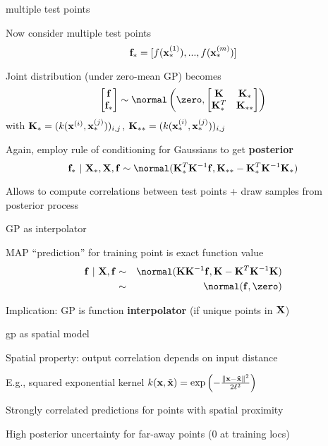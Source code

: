 \documentclass[11pt,compress,t,notes=noshow, xcolor=table]{beamer}
\begin{document}
\begin{framei}[sep=L]{multiple test points}
\item Now consider multiple test points
$$\fv_* = [f(\xi[1]_*), ..., f(\xi[m]_*)]$$
\item Joint distribution (under zero-mean GP) becomes
$$
    \begin{bmatrix} \fv \\ \fv_* \end{bmatrix} \sim  
    \normal\left(\zero, \begin{bmatrix} \Kmat & \Ks \\ \Ks^T & \Kss \end{bmatrix}\right)
  $$
with $\Ks = (k(\xi, \xs^{(j)}))_{i,j}$, $\Kss = (k(\xi[i]_*, \xi[j]_*))_{i,j}$
\item Again, employ rule of conditioning for Gaussians to get \textbf{posterior}
$$\fv_* ~|~ \Xmat_*, \Xmat, \fv \sim \normal(\Ks^{T}\Kinv\fv, \Kss - \Ks^T \Kmat ^{-1}\Ks)$$
\item Allows to compute correlations between test points + draw samples from posterior process
\end{framei}

\begin{framei}[sep=L]{GP as interpolator}
\item MAP ``prediction'' for training point is exact function value
\begin{eqnarray*}
\fv ~|~ \Xmat, \fv &\sim& \normal(\Kmat\Kinv\fv, \Kmat - \Kmat^T \Kinv \Kmat) \\ &\sim& \normal(\fv, \zero)
\end{eqnarray*}
\item Implication: GP is function \textbf{interpolator} (if unique points in $\Xmat$)
\vfill
{}
\end{framei}

\begin{framei}[sep=L]{gp as spatial model}
\item Spatial property: output correlation depends on input distance
\item E.g., squared exponential kernel $k(\xv, \tilde{\xv}) = \exp \left(-\frac{\| \xv - \tilde{\xv} \|^2}{2\ls^2} \right)$
\item Strongly correlated predictions for points with spatial proximity
\item High posterior uncertainty for far-away points (0 at training locs)
\vfill
{}
\end{framei}
\end{document}
